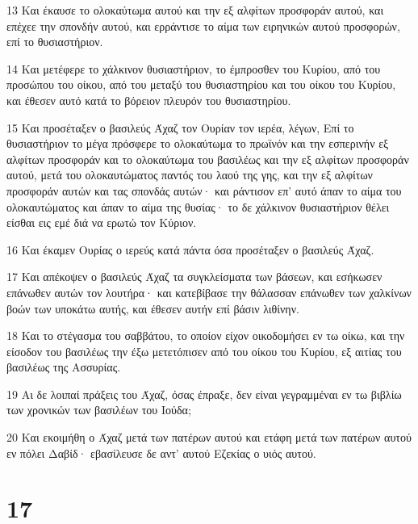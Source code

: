 \par 13 Και έκαυσε το ολοκαύτωμα αυτού και την εξ αλφίτων προσφοράν αυτού, και επέχεε την σπονδήν αυτού, και ερράντισε το αίμα των ειρηνικών αυτού προσφορών, επί το θυσιαστήριον.
\par 14 Και μετέφερε το χάλκινον θυσιαστήριον, το έμπροσθεν του Κυρίου, από του προσώπου του οίκου, από του μεταξύ του θυσιαστηρίου και του οίκου του Κυρίου, και έθεσεν αυτό κατά το βόρειον πλευρόν του θυσιαστηρίου.
\par 15 Και προσέταξεν ο βασιλεύς Άχαζ τον Ουρίαν τον ιερέα, λέγων, Επί το θυσιαστήριον το μέγα πρόσφερε το ολοκαύτωμα το πρωϊνόν και την εσπερινήν εξ αλφίτων προσφοράν και το ολοκαύτωμα του βασιλέως και την εξ αλφίτων προσφοράν αυτού, μετά του ολοκαυτώματος παντός του λαού της γης, και την εξ αλφίτων προσφοράν αυτών και τας σπονδάς αυτών· και ράντισον επ' αυτό άπαν το αίμα του ολοκαυτώματος και άπαν το αίμα της θυσίας· το δε χάλκινον θυσιαστήριον θέλει είσθαι εις εμέ διά να ερωτώ τον Κύριον.
\par 16 Και έκαμεν Ουρίας ο ιερεύς κατά πάντα όσα προσέταξεν ο βασιλεύς Άχαζ.
\par 17 Και απέκοψεν ο βασιλεύς Άχαζ τα συγκλείσματα των βάσεων, και εσήκωσεν επάνωθεν αυτών τον λουτήρα· και κατεβίβασε την θάλασσαν επάνωθεν των χαλκίνων βοών των υποκάτω αυτής, και έθεσεν αυτήν επί βάσιν λιθίνην.
\par 18 Και το στέγασμα του σαββάτου, το οποίον είχον οικοδομήσει εν τω οίκω, και την είσοδον του βασιλέως την έξω μετετόπισεν από του οίκου του Κυρίου, εξ αιτίας του βασιλέως της Ασσυρίας.
\par 19 Αι δε λοιπαί πράξεις του Άχαζ, όσας έπραξε, δεν είναι γεγραμμέναι εν τω βιβλίω των χρονικών των βασιλέων του Ιούδα;
\par 20 Και εκοιμήθη ο Άχαζ μετά των πατέρων αυτού και ετάφη μετά των πατέρων αυτού εν πόλει Δαβίδ· εβασίλευσε δε αντ' αυτού Εζεκίας ο υιός αυτού.

\chapter{17}

